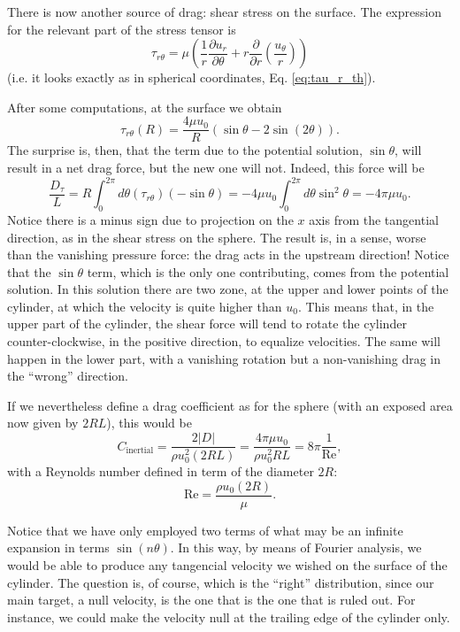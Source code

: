 There is now another source of drag: shear stress on the surface. The
expression for the relevant part of the stress tensor is
\[
  \tau_{r\theta} = \mu \left(
    \frac1r
    \frac{\partial u_r}{\partial \theta} +
    r \frac{\partial }{\partial r} \left( \frac{u_\theta}{r}\right) 
  \right) 
\]
(i.e. it looks exactly as in spherical coordinates,
Eq. \ref{eq:tau_r_th}).

After some computations, at the surface we obtain
\[
  \tau_{r\theta} (R)  =  \frac{4 \mu u_0}{R} \left(
    \sin\theta - 2 \sin(2\theta) 
  \right) .
\]
The surprise is, then, that the term due to the potential solution,
$\sin\theta$, will result in a net drag force, but the new one will
not. Indeed, this force will be
\begin{equation}
  \label{eq:viscous_drag_on_cyl_creeping}
  \frac{  D_\tau }{L} =
   R \int_0^{2\pi} d\theta  (\tau_{r\theta}) (- \sin\theta)  =
  - 4 \mu u_0 \int_0^{2\pi} d\theta  \sin^2\theta  =  - 4 \pi \mu u_0 .
\end{equation}
Notice there is a minus sign due to projection on the $x$ axis from
the tangential direction, as in the shear stress on the sphere.  The
result is, in a sense, worse than the vanishing pressure force: the
drag acts in the upstream direction! Notice that the $\sin\theta$
term, which is the only one contributing, comes from the potential
solution. In this solution there are two zone, at the upper and lower
points of the cylinder, at which the velocity is quite higher than
$u_0$. This means that, in the upper part of the cylinder, the shear
force will tend to rotate the cylinder counter-clockwise, in the
positive direction, to equalize velocities. The same will happen in
the lower part, with a vanishing rotation but a non-vanishing drag in
the ``wrong'' direction.

If we nevertheless define a drag coefficient as for the sphere (with
an exposed area now given by $2RL$), this would be
\[
  C_\mathrm{inertial} = \frac{  2 |D| }{ \rho u_0^2 (2 R L) } =
  \frac{ 4 \pi \mu u_0   }{ \rho u_0^2  R L } =
  8\pi \frac{1}{\mathrm{Re}} ,
\]
with a Reynolds number defined in term of the diameter $2R$:
\[
  \mathrm{Re} = \frac{ \rho u_0 ( 2 R ) }{ \mu } .
\]

Notice that we have only employed two terms of what may be an
infinite expansion in terms $\sin(n\theta)$. In this way, by means of
Fourier analysis, we would be able to produce any tangencial velocity
we wished on the surface of the cylinder. The question is, of course,
which is the ``right'' distribution, since our main target, a null
velocity, is the one that is the one that is ruled out. For instance,
we could make the velocity null at the trailing edge of the cylinder
only.

